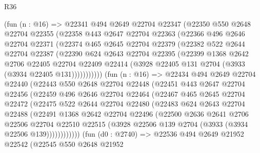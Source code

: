 \begin{lexlean}{R36}
\begin{coremodule}
        (fun (n : @16) =>
        @22341
          @494
          @2649
          @22704
          @22347
          (@22350
            @550
            @2648
            @22704
            @22355
            (@22358
              @443
              @2647
              @22704
              @22363
              (@22366
                @496
                @2646
                @22704
                @22371
                (@22374
                  @465
                  @2645
                  @22704
                  @22379
                  (@22382
                    @522
                    @2644
                    @22704
                    @22387
                    (@22390
                      @624
                      @2643
                      @22704
                      @22395
                      (@22399
                        @1368
                        @2642
                        @2706
                        @22405
                        @22704
                        @22409
                        @22414
                        (@3928 @22405 @131 @2704 (@3933 (@3934 @22405 @131)))))))))))
        (fun (n : @16) =>
        @22434
          @494
          @2649
          @22704
          @22440
          (@22443
            @550
            @2648
            @22704
            @22448
            (@22451
              @443
              @2647
              @22704
              @22456
              (@22459
                @496
                @2646
                @22704
                @22464
                (@22467
                  @465
                  @2645
                  @22704
                  @22472
                  (@22475
                    @522
                    @2644
                    @22704
                    @22480
                    (@22483
                      @624
                      @2643
                      @22704
                      @22488
                      (@22491
                        @1368
                        @2642
                        @22704
                        @22496
                        (@22500
                          @2636
                          @2641
                          @2706
                          @22506
                          @22704
                          @22510
                          @22515
                          (@3928 @22506 @139 @2704 (@3933 (@3934 @22506 @139))))))))))))
        (fun (d0 : @2740) =>
        @22536
          @494
          @2649
          @21952
          @22542
          (@22545
            @550
            @2648
            @21952

\end{coremodule}
\end{lexlean}
